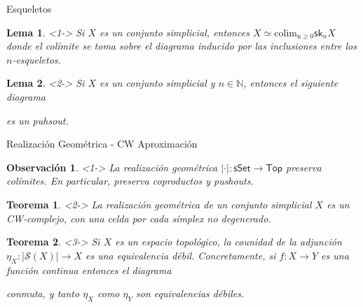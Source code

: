 \documentclass[11pt]{beamer}
\newcommand{\N}{\mathbb{N}}
\newcommand{\cat}[1]{\mathsf{#1}}
\newcommand{\sk}{\mathsf{sk}}
\renewcommand{\ss}[1]{\Delta^{#1}}
\newtheorem{teo}{Teorema}
\newtheorem{lema}{Lema}
\newtheorem{obs}{Observación}
\begin{document}
\begin{frame}{Esqueletos}
\begin{lema}<1-> Si $X$ es un conjunto simplicial, entonces $X \simeq \operatorname{colim_{n \geq 0}} \sk_nX$ donde el colímite se toma sobre el diagrama inducido por las inclusiones entre los $n$-esqueletos.
\end{lema}
\begin{lema}<2-> Si $X$ es un conjunto simplicial y $n \in \N$, entonces el siguiente diagrama
\begin{center}
\end{center}
es un puhsout.
\end{lema}
\end{frame}

\begin{frame}{Realización Geométrica - CW Aproximación}
\begin{obs} <1-> La realización geométrica $| \cdot | : \cat{sSet} \to \cat{Top}$ preserva colímites. En particular, preserva coproductos y pushouts.
\end{obs}

\begin{teo} <2-> La realización geométrica de un conjunto simplicial $X$ es un CW-complejo, con una celda por cada símplex no degenerado.
\end{teo}

\begin{teo} <3-> Si $X$ es un espacio topológico, la counidad de la adjunción $\eta_X : |\mathscr{S}(X)|\to X$ es una equivalencia débil. Concretamente, si $f : X \to Y$ es una función continua entonces el diagrama
\begin{center}
\end{center}
conmuta, y tanto $\eta_X$ como $\eta_Y$ son equivalencias débiles.
\end{teo}
\end{frame}
\end{document}
